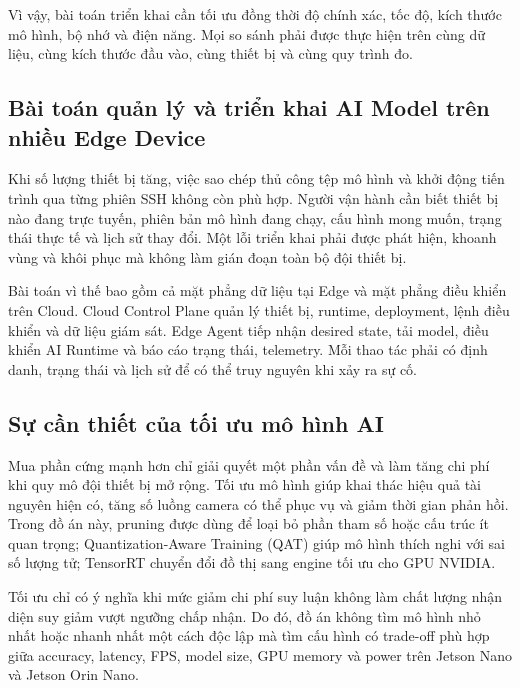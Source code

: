 Vì vậy, bài toán triển khai cần tối ưu đồng thời độ chính xác, tốc độ, kích thước
mô hình, bộ nhớ và điện năng. Mọi so sánh phải được thực hiện trên cùng dữ liệu,
cùng kích thước đầu vào, cùng thiết bị và cùng quy trình đo.

\subsection{Bài toán quản lý và triển khai AI Model trên nhiều Edge Device}

Khi số lượng thiết bị tăng, việc sao chép thủ công tệp mô hình và khởi động tiến
trình qua từng phiên SSH không còn phù hợp. Người vận hành cần biết thiết bị nào
đang trực tuyến, phiên bản mô hình đang chạy, cấu hình mong muốn, trạng thái
thực tế và lịch sử thay đổi. Một lỗi triển khai phải được phát hiện, khoanh vùng và
khôi phục mà không làm gián đoạn toàn bộ đội thiết bị.

Bài toán vì thế bao gồm cả mặt phẳng dữ liệu tại Edge và mặt phẳng điều khiển
trên Cloud. Cloud Control Plane quản lý thiết bị, runtime, deployment, lệnh điều
khiển và dữ liệu giám sát. Edge Agent tiếp nhận desired state, tải model, điều khiển
AI Runtime và báo cáo trạng thái, telemetry. Mỗi thao tác phải có định danh, trạng
thái và lịch sử để có thể truy nguyên khi xảy ra sự cố.

\subsection{Sự cần thiết của tối ưu mô hình AI}

Mua phần cứng mạnh hơn chỉ giải quyết một phần vấn đề và làm tăng chi phí khi
quy mô đội thiết bị mở rộng. Tối ưu mô hình giúp khai thác hiệu quả tài nguyên
hiện có, tăng số luồng camera có thể phục vụ và giảm thời gian phản hồi. Trong đồ
án này, pruning được dùng để loại bỏ phần tham số hoặc cấu trúc ít quan trọng;
Quantization-Aware Training (QAT) giúp mô hình thích nghi với sai số lượng tử;
TensorRT chuyển đổi đồ thị sang engine tối ưu cho GPU NVIDIA.

Tối ưu chỉ có ý nghĩa khi mức giảm chi phí suy luận không làm chất lượng nhận
diện suy giảm vượt ngưỡng chấp nhận. Do đó, đồ án không tìm mô hình nhỏ nhất
hoặc nhanh nhất một cách độc lập mà tìm cấu hình có trade-off phù hợp giữa
accuracy, latency, FPS, model size, GPU memory và power trên Jetson Nano và
Jetson Orin Nano.
